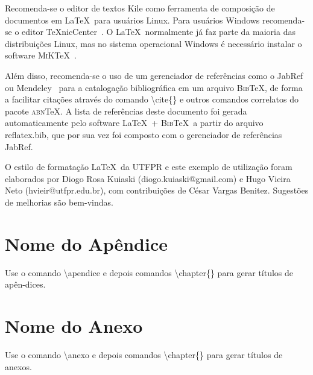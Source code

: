 \documentclass[openright]{normas-utf-tex} %
\begin{document}
Recomenda-se o editor de textos Kile como ferramenta de composi\c{c}\~ao de documentos em \LaTeX\ para usu\'arios Linux. Para usu\'arios Windows recomenda-se o editor \TeX nicCenter~\cite{TeXnicCenter2009}. O \LaTeX\ normalmente j\'a faz parte da maioria das distribui\c{c}\~oes Linux, mas no sistema operacional Windows \'e necess\'ario instalar o software \textsc{MiK}\TeX~\cite{MiKTeX2009}.

Al\'em disso, recomenda-se o uso de um gerenciador de refer\^encias como o JabRef~\cite{JabRef2009} ou Mendeley~\cite{Mendeley2009} para a cataloga\c{c}\~ao bibliogr\'afica em um arquivo \textsc{Bib}\TeX, de forma a facilitar cita\c{c}\~oes atrav\'es do comando {\ttfamily \textbackslash cite\{\}} e outros comandos correlatos do pacote \textsc{abn}\TeX. A lista de refer\^encias deste documento foi gerada automaticamente pelo software \LaTeX\ + \textsc{Bib}\TeX\ a partir do arquivo {\ttfamily reflatex.bib}, que por sua vez foi composto com o gerenciador de refer\^encias JabRef.

O estilo de formata\c{c}\~ao \LaTeX\ da UTFPR e este exemplo de utiliza\c{c}\~ao foram elaborados por Diogo Rosa Kuiaski (diogo.kuiaski@gmail.com) e Hugo Vieira Neto (hvieir@utfpr.edu.br), com contribui\c{c}\~oes de C\'esar Vargas Benitez. Sugest\~oes de melhorias s\~ao bem-vindas.


\clearpage %
\label{bibstart}
\label{bibend}

\apendice
\chapter{Nome do Ap\^endice}

Use o comando {\ttfamily \textbackslash apendice} e depois comandos {\ttfamily \textbackslash chapter\{\}}
para gerar t\'itulos de ap\^en-dices.


\anexo
\chapter{Nome do Anexo}

Use o comando {\ttfamily \textbackslash anexo} e depois comandos {\ttfamily \textbackslash chapter\{\}}
para gerar t\'itulos de anexos.
\end{document}
